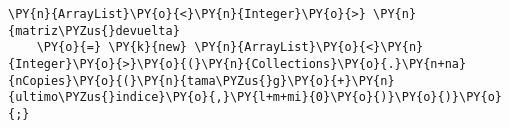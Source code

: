 \begin{Verbatim}[commandchars=\\\{\}]
\PY{n}{ArrayList}\PY{o}{<}\PY{n}{Integer}\PY{o}{>} \PY{n}{matriz\PYZus{}devuelta} 
    \PY{o}{=} \PY{k}{new} \PY{n}{ArrayList}\PY{o}{<}\PY{n}{Integer}\PY{o}{>}\PY{o}{(}\PY{n}{Collections}\PY{o}{.}\PY{n+na}{nCopies}\PY{o}{(}\PY{n}{tama\PYZus{}g}\PY{o}{+}\PY{n}{ultimo\PYZus{}indice}\PY{o}{,}\PY{l+m+mi}{0}\PY{o}{)}\PY{o}{)}\PY{o}{;}
\end{Verbatim}
